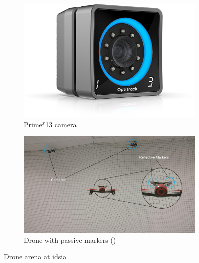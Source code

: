 \begin{figure}[!htb]
	\begin{center}
		\begin{subfigure}[h]{0.29\textwidth}
			\centering
			\includegraphics[width=1\textwidth]{"contents/images/03-optitrack-camera"}
			\caption[]{Prime$^x$13 camera}
			\label{fig:optitrack-camera}
		\end{subfigure}
		\hfill
		\begin{subfigure}[h]{0.69\textwidth}
			\centering
			\includegraphics[width=1\textwidth]{"contents/images/03-arena"}
			\caption[]{Drone with passive markers (\cite{mantegazza2018thesis})}
			\label{fig:drone-arena}
		\end{subfigure}
	\end{center}
	\vspace{-0.5cm}
	\caption[Drone arena at \gls{idsia}]{Drone arena at \gls{idsia}}
\end{figure}




